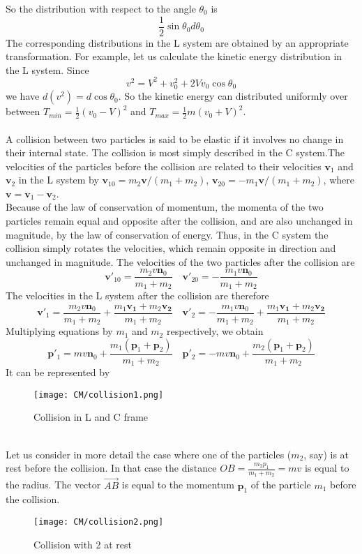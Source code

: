 \documentclass[cyan]{elegantnote}
\begin{document}
So the distribution with respect to the angle $\theta_0$ is
\[\frac{1}{2}\sin\theta_0 d\theta_0\]
The corresponding distributions in the L system are obtained by an appropriate transformation. For example, let us calculate the kinetic energy distribution in the L system.
Since
\[v^2 = V^2 + v_0^2 + 2Vv_0\cos\theta_0\] 
we have $d(v^2) = d\cos\theta_0$. So the kinetic energy can distributed uniformly over between $T_{min} = \frac{1}{2}(v_0-V)^2$ and $T_{max}= \frac{1}{2}m(v_0+V)^2$.\\ \\
A collision between two particles is said to be elastic if it involves no change in their internal state. The collision is most simply described in the C system.The velocities of the particles before the collision are related to their velocities $\bm{v}_1$ and
$\bm{v}_2$ in the L system by $\bm{v}_{10} = m_2\bm{v}/(m_1+m_2)$, $\bm{v}_{20} = -m_1\bm{v}/(m_1+m_2)$,
where $\bm{v} = \bm{v}_1-\bm{v}_2$.\\
Because of the law of conservation of momentum, the momenta of the two particles remain equal and opposite after the collision, and are also unchanged in magnitude, by the law of conservation of energy. 
Thus, in the C system the collision simply rotates the velocities, which remain opposite in direction and unchanged in magnitude. The velocities of the two particles after the collision are
\[\bm{v}'_{10} = \frac{m_2v\bm{n}_0}{m_1+m_2} \quad \bm{v}'_{20} = -\frac{m_1v\bm{n}_0}{m_1+m_2}\]
The velocities in the L system after the collision are therefore
\[\bm{v}'_{1} = \frac{m_2v\bm{n}_0}{m_1+m_2} + \frac{m_1\bm{v_1}+m_2\bm{v_2}}{m_1+m_2} \quad \bm{v}'_{2} = -\frac{m_1v\bm{n}_0}{m_1+m_2} + \frac{m_1\bm{v_1}+m_2\bm{v_2}}{m_1+m_2}\]
Multiplying equations by $m_1$ and $m_2$ respectively, we obtain
\[\bm{p}'_{1} = mv\bm{n}_0 + \frac{m_1(\bm{p}_1 + \bm{p}_2)}{m_1+m_2} \quad \bm{p}'_{2} = -mv\bm{n}_0 + \frac{m_2(\bm{p}_1 + \bm{p}_2)}{m_1+m_2}\]
It can be represented by
\begin{figure}[!h]
	\centering
	\texttt{[image: CM/collision1.png]}
	\caption{Collision in L and C frame}
\end{figure}\\
Let us consider in more detail the case where one of the particles ($m_2$, say) is at rest before the collision. In that case the distance $OB = \frac{m_2p_1}{m_1+m_2} = mv$ is equal to the radius. The vector $\vec{AB}$ is equal to the
momentum $\bm{p}_1$ of the particle $m_1$ before the collision.
\begin{figure}[!h]
	\centering
	\texttt{[image: CM/collision2.png]}
	\caption{Collision with 2 at rest}
\end{figure}\\
\end{document}
